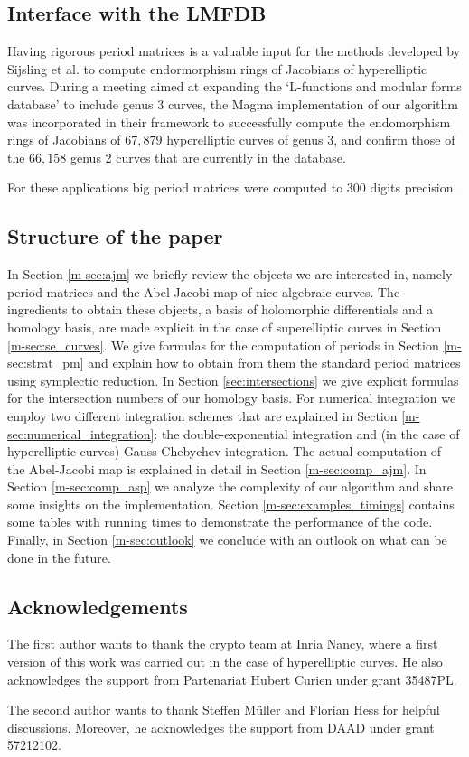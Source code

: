 \documentclass[main.tex]{subfiles}
\begin{document}
  \subsection{Interface with the LMFDB}

  Having rigorous period matrices is a valuable input for the methods developed by
  Sijsling et al. \cite{CMSVEndos} to compute endormorphism rings of Jacobians of hyperelliptic
  curves.
  During a meeting aimed at expanding the `L-functions and modular forms database' \cite[LMFDB]{lmfdb}
  to include genus $3$ curves, the Magma implementation of our algorithm was incorporated in their framework
  to successfully compute the endomorphism rings of Jacobians of $67,879$ hyperelliptic
  curves of genus $3$, and confirm those of the $66,158$ genus
  2 curves that are currently in the database.

  For these applications big period matrices were computed to $300$ digits precision.

  \subsection{Structure of the paper}

  In Section \ref{m-sec:ajm} we briefly review the objects we are interested
  in, namely period matrices and the Abel-Jacobi map of nice algebraic curves.
  The ingredients to obtain these objects, a basis of holomorphic differentials
  and a homology basis, are made explicit in the case of superelliptic curves
  in Section \ref{m-sec:se_curves}.
  We give formulas for the computation of periods in Section
  \ref{m-sec:strat_pm} and explain how to obtain from them the standard period
  matrices using symplectic reduction.
  In Section \ref{sec:intersections} we give explicit formulas for the
  intersection numbers of our homology basis.
  For numerical integration we employ two different integration schemes that
  are explained in Section \ref{m-sec:numerical_integration}: the
  double-exponential integration and
  (in the case of hyperelliptic curves) Gauss-Chebychev integration.
  The actual computation of the Abel-Jacobi map is explained in detail in
  Section \ref{m-sec:comp_ajm}.
  In Section \ref{m-sec:comp_asp} we analyze the complexity of our algorithm
  and share some insights on the implementation.
  Section \ref{m-sec:examples_timings} contains some tables with
  running times to demonstrate the performance of the code.
  Finally, in Section \ref{m-sec:outlook} we conclude with an outlook on what can be done in the future.
  
  \subsection{Acknowledgements}

  The first author wants to thank the crypto team at Inria Nancy, where
  a first version of this work was carried out in the case of hyperelliptic
  curves. He also acknowledges the support from Partenariat Hubert Curien under
  grant 35487PL.

  The second author wants to thank Steffen Müller and Florian Hess for helpful discussions.
  Moreover, he acknowledges the support from DAAD under grant 57212102.
\end{document}
